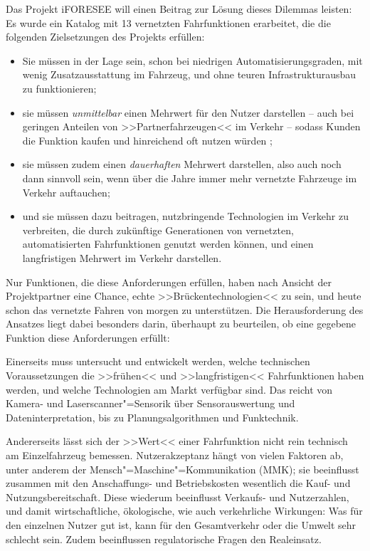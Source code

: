 Das Projekt iFORESEE will einen Beitrag zur Lösung dieses Dilemmas leisten: Es wurde ein Katalog mit 13 vernetzten Fahrfunktionen erarbeitet, die die folgenden Zielsetzungen des Projekts erfüllen:
\begin{itemize}
	\item Sie müssen in der Lage sein, schon bei niedrigen Automatisierungsgraden, mit wenig Zusatzausstattung im Fahrzeug, und ohne teuren Infrastrukturausbau zu funktionieren;
	\item sie müssen \emph{unmittelbar} einen Mehrwert für den Nutzer darstellen -- auch bei geringen Anteilen von >>Partnerfahrzeugen<< im Verkehr -- sodass Kunden die Funktion kaufen und hinreichend oft nutzen würden \citep{fank2017factors};
	\item sie müssen zudem einen \emph{dauerhaften} Mehrwert darstellen, also auch noch dann sinnvoll sein, wenn über die Jahre immer mehr vernetzte Fahrzeuge im Verkehr auftauchen;
	\item und sie müssen dazu beitragen, nutzbringende Technologien im Verkehr zu verbreiten, die durch zukünftige Generationen von vernetzten, automatisierten Fahrfunktionen genutzt werden können, und einen langfristigen Mehrwert im Verkehr darstellen.
\end{itemize}

Nur Funktionen, die diese Anforderungen erfüllen, haben nach Ansicht der Projektpartner eine Chance, echte >>Brückentechnologien<< zu sein, und heute schon das vernetzte Fahren von morgen zu unterstützen. Die Herausforderung des Ansatzes liegt dabei besonders darin, überhaupt zu beurteilen, ob eine gegebene Funktion diese Anforderungen erfüllt:

Einerseits muss untersucht und entwickelt werden, welche technischen Voraussetzungen die >>frühen<< und >>langfristigen<< Fahrfunktionen haben werden, und welche Technologien am Markt verfügbar sind. Das reicht von Kamera- und Laserscanner"=Sensorik über Sensorauswertung und Dateninterpretation, bis zu Planungsalgorithmen und Funktechnik.

Andererseits lässt sich der >>Wert<< einer Fahrfunktion nicht rein technisch am Einzelfahrzeug bemessen. Nutzerakzeptanz hängt von vielen Faktoren ab, unter anderem der Mensch"=Maschine"=Kommunikation (MMK); sie beeinflusst zusammen mit den Anschaffungs- und Betriebskosten wesentlich die Kauf- und Nutzungsbereitschaft. Diese wiederum beeinflusst Verkaufs- und Nutzerzahlen, und damit wirtschaftliche, ökologische, wie auch verkehrliche Wirkungen: Was für den einzelnen Nutzer gut ist, kann für den Gesamtverkehr oder die Umwelt sehr schlecht sein. Zudem beeinflussen regulatorische Fragen den Realeinsatz.

